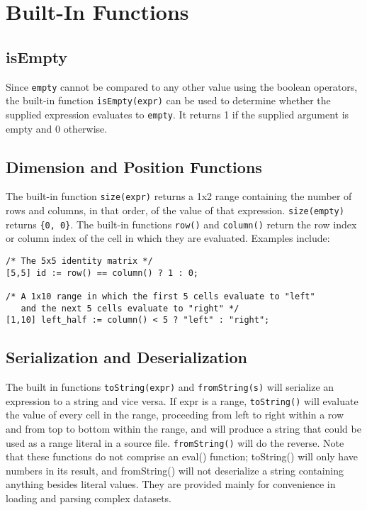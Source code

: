 \section {Built-In Functions}
\subsection{isEmpty}
Since \texttt{empty} cannot be compared to any other value using the boolean operators, the built-in function \texttt{isEmpty(expr)} can be used to determine whether the supplied expression evaluates to \texttt{empty}. It returns 1 if the supplied argument is empty and 0 otherwise.
\subsection{Dimension and Position Functions}
The built-in function \texttt{size(expr)} returns a 1x2 range containing the number of rows and columns, in that order, of the value of that expression. \texttt{size(empty)} returns \texttt{\{0, 0\}}. The built-in functions \texttt{row()} and \texttt{column()} return the row index or column index of the cell in which they are evaluated. Examples include:

\begin{lstlisting}
/* The 5x5 identity matrix */
[5,5] id := row() == column() ? 1 : 0; 

/* A 1x10 range in which the first 5 cells evaluate to "left"
   and the next 5 cells evaluate to "right" */
[1,10] left_half := column() < 5 ? "left" : "right";
\end{lstlisting}
\subsection{Serialization and Deserialization}
The built in functions \texttt{toString(expr)} and \texttt{fromString(s)} will serialize an expression to a string and vice versa. If expr is a range, \texttt{toString()} will evaluate the value of every cell in the range, proceeding from left to right within a row and from top to bottom within the range, and will produce a string that could be used as a range literal in a source file. \texttt{fromString()} will do the reverse. Note that these functions do not comprise an eval() function; toString() will only have numbers in its result, and fromString() will not deserialize a string containing anything besides literal values. They are provided mainly for convenience in loading and parsing complex datasets. 
